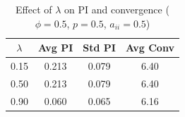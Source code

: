
\begin{table}[H]
\centering
\small
\begin{tabular}{cccc}
\hline
$\lambda$ & Avg PI & Std PI & Avg Conv \\
\hline
0.15 & 0.213 & 0.079 & 6.40 \\
0.50 & 0.213 & 0.079 & 6.40 \\
0.90 & 0.060 & 0.065 & 6.16 \\
\hline
\end{tabular}
\caption{Effect of $\lambda$ on PI and convergence ($\phi=0.5$, $p=0.5$, $a_{ii}=0.5$)}
\end{table}
